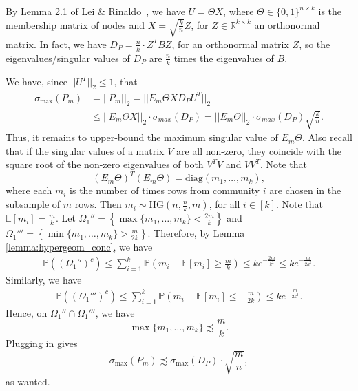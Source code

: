\documentclass{article}
\newcommand{\real}{\mathbb{R}}
\begin{document}
By Lemma 2.1 of Lei \& Rinaldo~\cite{LeiRin15}, we have $U = \Theta X$, where $\Theta \in \{0,1\}^{n \times k}$ is the membership matrix of nodes and $X = \sqrt{\frac{k}{n}} Z$, for $Z \in \real^{k \times k}$ an orthonormal matrix. In fact, we have $D_P = \frac{n}{k} \cdot Z^TBZ$, for an orthonormal matrix $Z$, so the eigenvalues/singular values of $D_P$ are $\frac{n}{k}$ times the eigenvalues of $B$.

We have, since $||U^T||_2 \leq 1$, that
\begin{align*}
\sigma_{\max}(P_m) &= ||P_m||_2 = ||E_m\Theta XD_PU^T||_2 \\
%
& \leq ||E_m\Theta X||_2 \cdot \sigma_{max}(D_P) = ||E_m\Theta ||_2 \cdot \sigma_{max}(D_P)\sqrt{\frac{k}{n}}.
\end{align*}
Thus, it remains to upper-bound the maximum singular value of $E_m \Theta$. Also recall that if the singular values of a matrix $V$ are all non-zero, they coincide with the square root of the non-zero eigenvalues of both $V^TV$ and $VV^T$. Note that
\begin{equation*}
(E_m \Theta)^T (E_m \Theta) = \mathrm{diag}(m_1, \dots, m_k),
\end{equation*}
where each $m_i$ is the number of times rows from community $i$ are chosen in the subsample of $m$ rows.
Then $m_i \sim \mathrm{HG}\left(n, \frac{n}{k}, m\right)$, for all $i \in [k]$. Note that $\mathbb{E}[m_i] = \frac{m}{k}$. Let $\Omega_1'' = \left\{\max\{m_1, \dots, m_k\} < \frac{2m}{k}\right\}$ and $\Omega_1''' = \left\{\min\{m_1, \dots, m_k\} > \frac{m}{2k}\right\}$. Therefore, by Lemma \ref{lemma:hypergeom_conc}, we have
\begin{align*}
\mathbb{P}\left((\Omega_1'')^{c}\right) \leq \sum_{i = 1}^k\mathbb{P}\left(m_i - \mathbb{E}[m_i] \geq \frac{m}{k}\right) \leq ke^{-\frac{2m}{k^2}} \leq ke^{-\frac{m}{2k^2}}.
\end{align*}
Similarly, we have
\begin{align*}
\mathbb{P}\left((\Omega_1''')^c\right) \leq \sum_{i = 1}^k\mathbb{P}\left(m_i - \mathbb{E}[m_i] \leq -\frac{m}{2k}\right) \leq ke^{-\frac{m}{2k^2}}.
\end{align*}
Hence, on $\Omega_1'' \cap \Omega_1'''$, we have
\begin{equation*}
\max\{m_1, \dots, m_k\} \precsim\frac{m}{k}.
\end{equation*}
Plugging in gives
\begin{equation*}
\sigma_{\max}(P_m) \precsim \sigma_{\max}(D_P) \cdot \sqrt{\frac{m}{n}},
\end{equation*}
as wanted.
\end{document}
